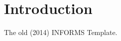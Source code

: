 \documentclass[nonblindrev]{informs3}
\begin{document}
%






\section{Introduction} \label{SEC: Introduction}


The old (2014) INFORMS Template.

\cite{acimovicModelsMetricsAssess2016}



 

\end{document}
